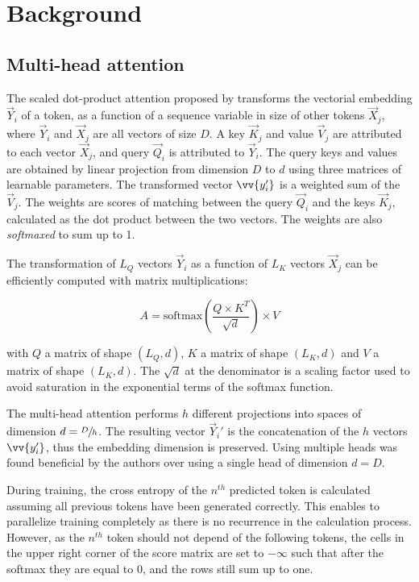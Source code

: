 \section{Background}

\subsection{Multi-head attention}

The scaled dot-product attention proposed by
\citet{vaswani2017attention} transforms the vectorial embedding $\vec{Y}_i$ of a token, as a
 function of a sequence variable in size of other tokens $\vec{X}_j$, where
 $\vec{Y}_i$ and $\vec{X}_j$ are all vectors of size $D$. A key
$\vec{K}_j$ and value $\vec{V}_j$ are attributed to each vector
$\vec{X}_j$, and query $\vec{Q}_i$ is attributed to $\vec{Y}_i$.
 The query keys and values are obtained by linear projection from dimension $D$ to $d$ using three matrices of learnable parameters. The transformed vector
 $\vv{y_i'}$ is a weighted sum of the $\vec{V}_j$. The weights are
 scores of matching between the query $\vec{Q}_i$ and the keys
$\vec{K}_j$, calculated as the dot product between the two vectors.
The weights are also \emph{softmaxed} to sum up to 1. 

The transformation of $L_Q$
vectors $\vec{Y}_i$ as a function of $L_K$ vectors $\vec{X}_j$ can be efficiently computed with matrix multiplications:

\begin{equation}
A = \mathrm{softmax}\left(\frac{Q \times K^T}{\sqrt{d}}\right) \times V
\end{equation}

\noindent{}with $Q$ a matrix of shape $(L_Q, d)$, $K$ a matrix of shape
 $(L_K, d)$ and $V$ a matrix of shape $(L_K, d)$. The $\sqrt{d}$
at the denominator is a scaling factor used to avoid saturation in the
exponential terms of the softmax function.

The multi-head attention performs $h$ different projections into spaces
 of dimension $d = \sfrac{D}{h}$. The resulting vector $\vec{Y}_i'$ is the
concatenation of the $h$ vectors $\vv{y_i'}$, thus the
embedding dimension is preserved. Using multiple heads was found
beneficial by the authors over using a single head of dimension
$d = D$.

During training, the cross entropy of the $n^{th}$ predicted token is
 calculated assuming all previous tokens have been generated correctly.
 This enables to parallelize training completely as there is no
recurrence in the calculation process. However, as the $n^{th}$ token should not depend of the
following tokens, the cells in the upper right corner of the score
matrix are set to $-\infty$ such that after the softmax they are equal
to 0, and the rows still sum up to one.

